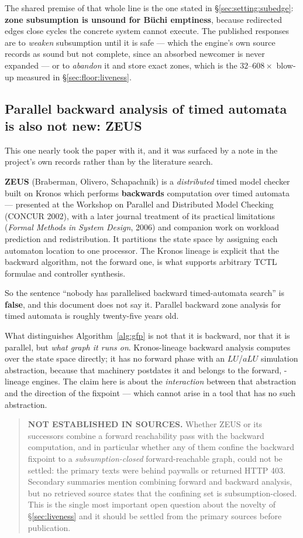The shared premise of that whole line is the one stated in \S\ref{sec:setting:subedge}:
\textbf{zone subsumption is unsound for B\"uchi emptiness}, because redirected edges close cycles
the concrete system cannot execute. The published responses are to \emph{weaken} subsumption until
it is safe --- which the engine's own source records as sound but not complete, since an absorbed
newcomer is never expanded --- or to \emph{abandon} it and store exact zones, which is the
$32$--$608\times$ blow-up measured in \S\ref{sec:floor:liveness}.

\subsection{Parallel backward analysis of timed automata is also not new: ZEUS}
\label{sec:related:zeus}

This one nearly took the paper with it, and it was surfaced by a note in the project's own records
rather than by the literature search.

\textbf{ZEUS} (Braberman, Olivero, Schapachnik) is a \emph{distributed} timed model checker built on
Kronos which performs \textbf{backwards} computation over timed automata --- presented at the
Workshop on Parallel and Distributed Model Checking (CONCUR 2002), with a later journal treatment of
its practical limitations (\emph{Formal Methods in System Design}, 2006) and companion work on
workload prediction and redistribution. It partitions the state space by assigning each automaton
location to one processor. The Kronos lineage is explicit that the backward algorithm, not the
forward one, is what supports arbitrary TCTL formulae and controller synthesis.

So the sentence ``nobody has parallelised backward timed-automata search'' is \textbf{false}, and
this document does not say it. Parallel backward zone analysis for timed automata is roughly
twenty-five years old.

What distinguishes Algorithm~\ref{alg:gfp} is not that it is backward, nor that it is parallel, but
\emph{what graph it runs on}. Kronos-lineage backward analysis computes over the state space
directly; it has no forward phase with an $LU$/$aLU$ simulation abstraction, because that machinery
postdates it and belongs to the forward, \uppaal{}-lineage engines. The claim here is about the
\emph{interaction} between that abstraction and the direction of the fixpoint --- which cannot arise
in a tool that has no such abstraction.

\begin{quote}
\textbf{NOT ESTABLISHED IN SOURCES.} Whether ZEUS or its successors combine a forward reachability
pass with the backward computation, and in particular whether any of them confine the backward
fixpoint to a \emph{subsumption-closed} forward-reachable graph, could not be settled: the primary
texts were behind paywalls or returned HTTP 403. Secondary summaries mention combining forward and
backward analysis, but no retrieved source states that the confining set is subsumption-closed. This
is the single most important open question about the novelty of \S\ref{sec:liveness} and it should be
settled from the primary sources before publication.
\end{quote}

